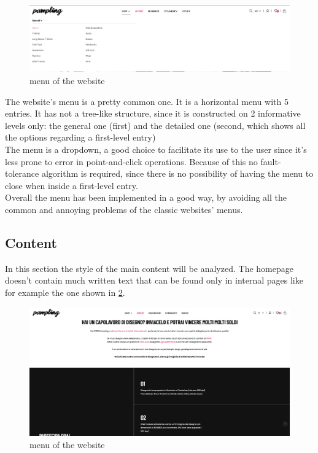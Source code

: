 \begin{figure}[h!]
	\centering
	\includegraphics[scale=0.225]{images/menu.png}
	\caption{menu of the website}
	\label{fig:menu}
\end{figure}

The website's menu is a pretty common one. It is a horizontal menu with 5 entries. 
It has not a tree-like structure, since it is constructed on 2 informative levels only: the general one (first) and the detailed one (second, which shows all the options regarding a first-level entry)\\
The menu is a dropdown, a good choice to facilitate its use to the user since it's less prone to error in point-and-click operations. 
Because of this no fault-tolerance algorithm is required, since there is no possibility of having the menu to close when inside a first-level entry.\\
Overall the menu has been implemented in a good way, by avoiding all the common and annoying problems of the classic websites' menus.

\subsection{Content}
In this section the style of the main content will be analyzed. 
The homepage doesn't contain much written text that can be found only in internal pages like for example 
the one shown in \cref{fig:content}.

\begin{figure}[h!]
	\centering
	\includegraphics[scale=0.225]{images/content.png}
	\caption{menu of the website}
	\label{fig:content}
\end{figure}

